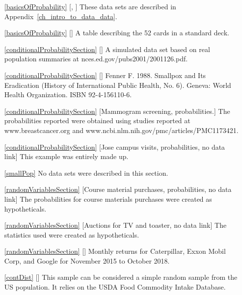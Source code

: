 \begin{itemize}
\item[\ref{basicsOfProbability}]
    [\datalink{loan50}, \datalink{county}]
    These data sets are described in
    Appendix~\ref{ch_intro_to_data_data}.
\item[\ref{basicsOfProbability}]
    [\datalink{playing\_cards}]
    A table describing the 52 cards in a standard deck.

\item[\ref{conditionalProbabilitySection}]
    [\datalink{family\_college}]
    A simulated data set based on real population summaries at
        {nces.ed.gov/pubs2001/2001126.pdf}.
\item[\ref{conditionalProbabilitySection}]
    [\datalink{smallpox}]
    Fenner F. 1988.
    Smallpox and Its Eradication
    (History of International Public Health, No. 6).
    Geneva: World Health Organization. ISBN 92-4-156110-6.

\item[\ref{conditionalProbabilitySection}]
    [Mammogram screening, probabilities.]
    The probabilities reported were obtained using studies
    reported at
        {www.breastcancer.org}
    and 
        {www.ncbi.nlm.nih.gov/pmc/articles/PMC1173421}. 

\item[\ref{conditionalProbabilitySection}]
    [Jose campus visits, probabilities, no data link]
    This example was entirely made up.

\item[\ref{smallPop}]
    No data sets were described in this section.

\item[\ref{randomVariablesSection}]
    [Course material purchases, probabilities, no data link]
    The probabilities for course materials purchases were
    created as hypotheticals.

\item[\ref{randomVariablesSection}]
    [Auctions for TV and toaster, no data link]
    The statistics used were created as hypotheticals.

\item[\ref{randomVariablesSection}]
    [\datalink{stocks\_18}]
    Monthly returns for Caterpillar, Exxon Mobil Corp,
    and Google for November 2015 to October 2018.

\item[\ref{contDist}]
    [\datalink{fcid}]
    This sample can be considered a simple random sample
    from the US population.
    It relies on the USDA Food Commodity Intake Database.

\end{itemize}




